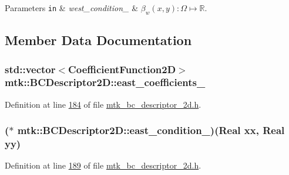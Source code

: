 \begin{DoxyParams}[1]{Parameters}
\mbox{\tt in}  & {\em west\+\_\+condition\+\_\+} & $ \beta_w(x,y):\Omega\mapsto\mathbb{R} $. \\
\hline
\end{DoxyParams}


\subsection{Member Data Documentation}
\hypertarget{classmtk_1_1BCDescriptor2D_a1f90fc303984bf18c136a34896bbb7c9}{
\subsubsection[{east\+\_\+coefficients\+\_\+}]{\setlength{\rightskip}{0pt plus 5cm}std\+::vector$<${\bf Coefficient\+Function2\+D}$>$ mtk\+::\+B\+C\+Descriptor2\+D\+::east\+\_\+coefficients\+\_\+\hspace{0.3cm}{\ttfamily [private]}}}\label{classmtk_1_1BCDescriptor2D_a1f90fc303984bf18c136a34896bbb7c9}


Definition at line \hyperlink{mtk__bc__descriptor__2d_8h_source_l00184}{184} of file \hyperlink{mtk__bc__descriptor__2d_8h_source}{mtk\+\_\+bc\+\_\+descriptor\+\_\+2d.\+h}.

\hypertarget{classmtk_1_1BCDescriptor2D_ad63ffb74a62474e753e135324e6462d0}{
\subsubsection[{east\+\_\+condition\+\_\+}]{($\ast$ mtk\+::\+B\+C\+Descriptor2\+D\+::east\+\_\+condition\+\_\+)({\bf Real} xx, {\bf Real} yy)\hspace{0.3cm}{\ttfamily [private]}}}\label{classmtk_1_1BCDescriptor2D_ad63ffb74a62474e753e135324e6462d0}


Definition at line \hyperlink{mtk__bc__descriptor__2d_8h_source_l00189}{189} of file \hyperlink{mtk__bc__descriptor__2d_8h_source}{mtk\+\_\+bc\+\_\+descriptor\+\_\+2d.\+h}.

